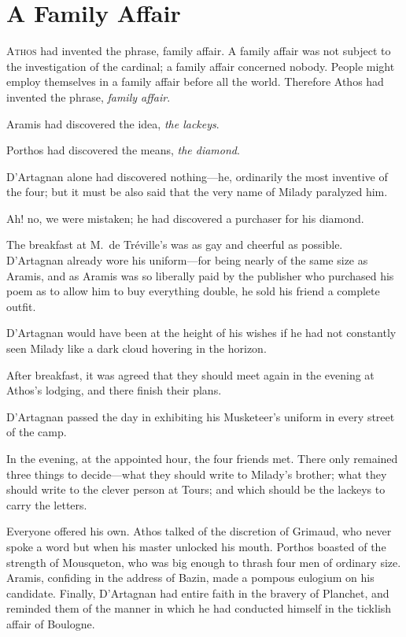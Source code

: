 
\chapter{A Family Affair}

\lettrine{A}{thos} had invented the phrase, family affair. A family affair was not subject to the investigation of the cardinal; a family affair concerned nobody. People might employ themselves in a family affair before all the world. Therefore Athos had invented the phrase, \textit{family affair}. 

Aramis had discovered the idea, \textit{the lackeys}. 

Porthos had discovered the means, \textit{the diamond}. 

D'Artagnan alone had discovered nothing—he, ordinarily the most inventive of the four; but it must be also said that the very name of Milady paralyzed him. 

Ah! no, we were mistaken; he had discovered a purchaser for his diamond. 

The breakfast at M.~de Tréville's was as gay and cheerful as possible. D'Artagnan already wore his uniform—for being nearly of the same size as Aramis, and as Aramis was so liberally paid by the publisher who purchased his poem as to allow him to buy everything double, he sold his friend a complete outfit. 

D'Artagnan would have been at the height of his wishes if he had not constantly seen Milady like a dark cloud hovering in the horizon. 

After breakfast, it was agreed that they should meet again in the evening at Athos's lodging, and there finish their plans. 

D'Artagnan passed the day in exhibiting his Musketeer's uniform in every street of the camp. 

In the evening, at the appointed hour, the four friends met. There only remained three things to decide—what they should write to Milady's brother; what they should write to the clever person at Tours; and which should be the lackeys to carry the letters. 

Everyone offered his own. Athos talked of the discretion of Grimaud, who never spoke a word but when his master unlocked his mouth. Porthos boasted of the strength of Mousqueton, who was big enough to thrash four men of ordinary size. Aramis, confiding in the address of Bazin, made a pompous eulogium on his candidate. Finally, D'Artagnan had entire faith in the bravery of Planchet, and reminded them of the manner in which he had conducted himself in the ticklish affair of Boulogne. 


